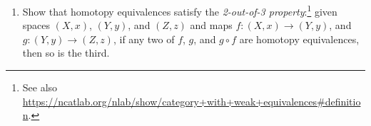 \documentclass{article}
\begin{document}
\begin{enumerate}
        
    \item Show that homotopy equivalences satisfy the \emph{2-out-of-3 property}:\footnote{See also \url{https://ncatlab.org/nlab/show/category+with+weak+equivalences\#definition}.} given spaces $(X,x)$, $(Y,y)$, and $(Z,z)$ and maps $f:(X,x) \to (Y,y)$, and $g:(Y,y) \to (Z,z)$, if any two of $f$, $g$, and $g \circ f$ are homotopy equivalences, then so is the third.
    \begin{center}
    \end{center}
\end{enumerate}
\end{document}

